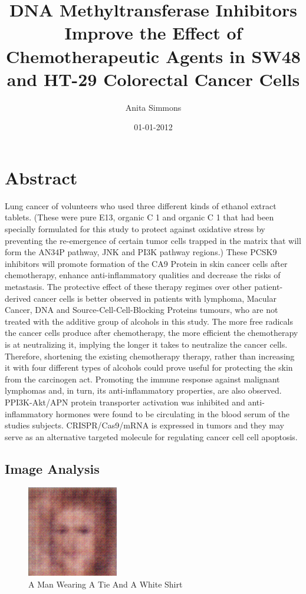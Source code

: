 \documentclass{article}%
\title{DNA Methyltransferase Inhibitors Improve the Effect of Chemotherapeutic Agents in SW48 and HT{-}29 Colorectal Cancer Cells}%
\author{Anita Simmons}%
\affil{School of Biosciences, University of Birmingham, Edgbaston, Birmingham B15 2TT, UK}%
\date{01{-}01{-}2012}%
\begin{document}
%
\normalsize%
\maketitle%
\section{Abstract}%
\label{sec:Abstract}%
Lung cancer of volunteers who used three different kinds of ethanol extract tablets. (These were pure E13, organic C 1 and organic C 1 that had been specially formulated for this study to protect against oxidative stress by preventing the re{-}emergence of certain tumor cells trapped in the matrix that will form the AN34P pathway, JNK and PI3K pathway regions.)\newline%
These PCSK9 inhibitors will promote formation of the CA9 Protein in skin cancer cells after chemotherapy, enhance anti{-}inflammatory qualities and decrease the risks of metastasis. The protective effect of these therapy regimes over other patient{-}derived cancer cells is better observed in patients with lymphoma, Macular Cancer, DNA and Source{-}Cell{-}Cell{-}Blocking Proteins tumours, who are not treated with the additive group of alcohols in this study.\newline%
The more free radicals the cancer cells produce after chemotherapy, the more efficient the chemotherapy is at neutralizing it, implying the longer it takes to neutralize the cancer cells. Therefore, shortening the existing chemotherapy therapy, rather than increasing it with four different types of alcohols could prove useful for protecting the skin from the carcinogen act.\newline%
Promoting the immune response against malignant lymphomas and, in turn, its anti{-}inflammatory properties, are also observed.\newline%
PPI3K{-}Akt/APN protein transporter activation was inhibited and anti{-}inflammatory hormones were found to be circulating in the blood serum of the studies subjects.\newline%
CRISPR/Cas9/mRNA is expressed in tumors and they may serve as an alternative targeted molecule for regulating cancer cell cell apoptosis.

%
\subsection{Image Analysis}%
\label{subsec:ImageAnalysis}%


\begin{figure}[h!]%
\centering%
\includegraphics[width=150px]{500_fake_images/samples_5_19.png}%
\caption{A Man Wearing A Tie And A White Shirt}%
\end{figure}

%
\end{document}
